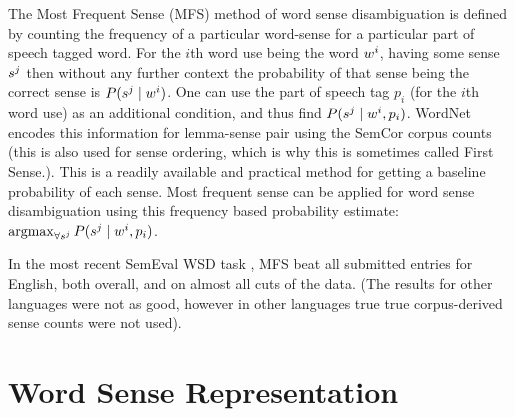 \documentclass[12pt,parskip]{komatufte}
\begin{document}
The Most Frequent Sense (MFS) method of word sense disambiguation is defined by counting the frequency of a particular word-sense for a particular part of speech tagged word.
For the $i$th word use being the word $\n w_i$, having some sense $\n s_j$
then without any further context the 
probability of that sense being the correct sense is $P(\n s_j \mid \n w_i)$.
One can use the part of speech tag $p_i$ (for the $i$th word use) as an additional condition, and thus find $P(\n s_j \mid \n w_i, p_i)$.
WordNet encodes this information for lemma-sense pair using the SemCor corpus counts (this is also used for sense ordering, which is why this is sometimes called First Sense.).
This is a readily available and practical method for getting a baseline probability of each sense.
Most frequent sense can be applied for word sense disambiguation using this frequency based probability estimate:  $\argmax_{\forall \n s_j} P(\n s_j \mid \n w_i, p_i)$.


In the most recent SemEval WSD task ,
MFS beat all submitted entries for English, both overall, and on almost all cuts of the data.
(The results for other languages were not as good, however in other languages true true corpus-derived sense counts were not used).



\section{Word Sense Representation}
\end{document}
